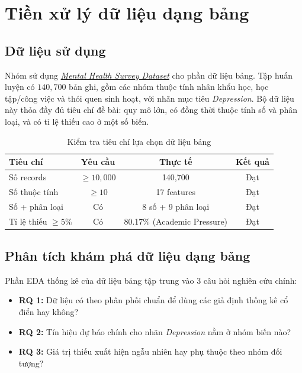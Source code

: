 \section{Tiền xử lý dữ liệu dạng bảng}

\subsection{Dữ liệu sử dụng}
Nhóm sử dụng \href{https://www.kaggle.com/competitions/playground-series-s4e11/data}{\textit{Mental Health Survey Dataset}} cho phần dữ liệu bảng. Tập huấn luyện có $140{,}700$ bản ghi, gồm các nhóm thuộc tính nhân khẩu học, học tập/công việc và thói quen sinh hoạt, với nhãn mục tiêu \textit{Depression}. Bộ dữ liệu này thỏa đầy đủ tiêu chí đề bài: quy mô lớn, có đồng thời thuộc tính số và phân loại, và có tỉ lệ thiếu cao ở một số biến.

\begin{table}[H]
    \centering
    \begin{tabular}{|l|c|c|c|}
        \hline
        \textbf{Tiêu chí}      & \textbf{Yêu cầu} & \textbf{Thực tế}            & \textbf{Kết quả} \\
        \hline
        Số records             & $\geq 10{,}000$  & 140{,}700                   & Đạt              \\
        \hline
        Số thuộc tính          & $\geq 10$        & 17 features                 & Đạt              \\
        \hline
        Số + phân loại         & Có               & 8 số + 9 phân loại          & Đạt              \\
        \hline
        Tỉ lệ thiếu $\geq 5\%$ & Có               & 80.17\% (Academic Pressure) & Đạt              \\
        \hline
    \end{tabular}
    \caption{Kiểm tra tiêu chí lựa chọn dữ liệu bảng}
\end{table}

\subsection{Phân tích khám phá dữ liệu dạng bảng}
Phần EDA thống kê của dữ liệu bảng tập trung vào 3 câu hỏi nghiên cứu chính:
\begin{itemize}
    \item \textbf{RQ 1:} Dữ liệu có theo phân phối chuẩn để dùng các giả định thống kê cổ điển hay không?
    \item \textbf{RQ 2:} Tín hiệu dự báo chính cho nhãn \textit{Depression} nằm ở nhóm biến nào?
    \item \textbf{RQ 3:} Giá trị thiếu xuất hiện ngẫu nhiên hay phụ thuộc theo nhóm đối tượng?
\end{itemize}

